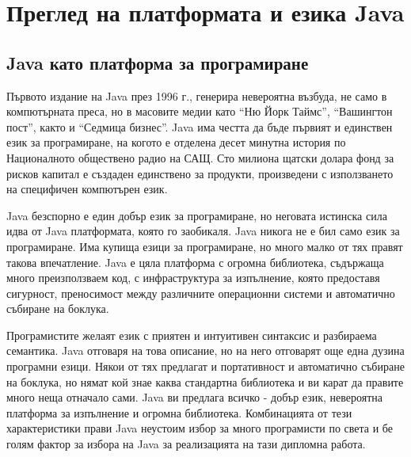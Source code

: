 \section{Преглед на платформата и езика Java}
\subsection{Java като платформа за програмиране}
Първото издание на Java през 1996 г., генерира невероятна
възбуда, не само в компютърната преса, но в масовите медии като "`Ню
Йорк Таймс"', "`Вашингтон пост"', както и "`Седмица бизнес"'. Java има
честта да бъде  първият и единствен език за програмиране, на когото е
отделена десет минутна история по Националното обществено радио на САЩ. Сто
милиона щатски долара фонд за рисков капитал е създаден единствено за
продукти, произведени с използването на специфичен компютърен език.

Java безспорно е един добър език за програмиране, но неговата истинска
сила идва от Java платформата, която го заобикаля. Java никога не е
бил само език за програмиране. Има купища езици за програмиране, но
много малко от тях правят такова впечатление. Java е цяла платформа с
огромна библиотека, съдържаща много преизползваем код, с
инфраструктура за изпълнение, която предоставя сигурност, преносимост
между различните операционни системи и автоматично събиране на
боклука.

Програмистите желаят език с приятен и интуитивен синтаксис и
разбираема семантика. Java отговаря на това описание, но на него
отговарят още една дузина програмни езици. Някои от тях предлагат и
портативност и автоматично събиране на боклука, но нямат кой знае
каква стандартна библиотека и ви карат да правите много неща отначало
сами. Java ви предлага всичко - добър език, невероятна платформа за
изпълнение и огромна библиотека. Комбинацията от тези характеристики
прави Java неустоим избор за много програмисти по света и бе голям
фактор за избора на Java за реализацията на тази дипломна работа. 
